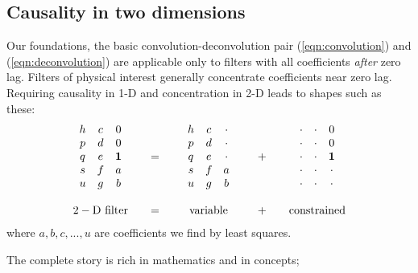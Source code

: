 \subsection{Causality in two dimensions}
Our foundations,
the basic convolution-deconvolution pair
(\ref{eqn:convolution}) and
(\ref{eqn:deconvolution})
are applicable only to filters with all coefficients {\it after} zero lag.
Filters of physical interest generally concentrate coefficients near zero lag.
Requiring causality in 1-D and concentration in 2-D leads to shapes such as these:
\begin{equation}
\label{eqn:2dpef}
\begin{array}{ccccc}
        \begin{array}{ccc}
                h  & c &   0 \\
                p  & d &   0 \\
                q  & e &  \bold 1    \\
                s  & f &   a \\
                u  & g &   b
        \end{array}
        &\quad=\quad&
        \begin{array}{ccc}
                h  & c &  \cdot   \\
                p  & d &  \cdot   \\
                q  & e &  \cdot    \\
                s  & f &   a \\
                u  & g &   b
        \end{array}
         &\quad +\quad&
        \begin{array}{ccc}
                \cdot &\cdot &   0 \\
                \cdot &\cdot &   0 \\
                \cdot &\cdot &  \bold 1    \\
                \cdot &\cdot &  \cdot    \\
                \cdot &\cdot &  \cdot  
        \end{array}
  \\
  \\
        {\rm 2-D \ filter}
           &=&
        {\rm variable}
          &\quad +\quad&
        {\rm constrained}
\end{array}
\end{equation}
where $a,b,c,...,u$ are coefficients we find by least squares.
\par
The complete story is rich in mathematics and in concepts;
